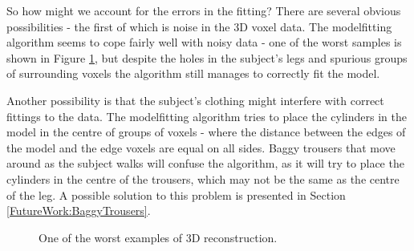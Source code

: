 \bigskip
\noindent So how might we account for the errors in the fitting?
There are several obvious possibilities - the first of which is noise in the 3D voxel data.
The modelfitting algorithm seems to cope fairly well with noisy data - one of the worst samples is shown in Figure \ref{BadData}, but despite the holes in the subject's legs and spurious groups of surrounding voxels the algorithm still manages to correctly fit the model.

Another possibility is that the subject's clothing might interfere with correct fittings to the data.
The modelfitting algorithm tries to place the cylinders in the model in the centre of groups of voxels - where the distance between the edges of the model and the edge voxels are equal on all sides.
Baggy trousers that move around as the subject walks will confuse the algorithm, as it will try to place the cylinders in the centre of the trousers, which may not be the same as the centre of the leg.
A possible solution to this problem is presented in Section \ref{FutureWork:BaggyTrousers}.

\begin{figure}[bp]
	\centering
	\quad
	
	\caption{One of the worst examples of 3D reconstruction.}
	\label{BadData}
\end{figure}

